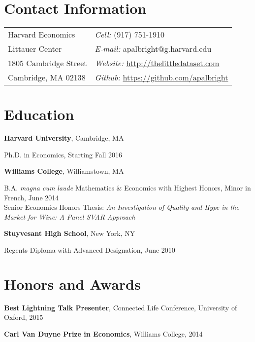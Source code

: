 \documentclass[margin,line]{res}
\begin{document}

\begin{resume}
\section{\sc Contact Information}
\vspace{.05in}
\begin{tabular}{@{}p{2in}p{4in}}
Harvard Economics  & {\it Cell:}  (917) 751-1910 \\  
Littauer Center & {\it E-mail:}  {\ttfamily apalbright@g.harvard.edu} \\              
1805 Cambridge Street  & {\it Website:} \href{http://thelittledataset.com}{\ttfamily http://thelittledataset.com}\\       
Cambridge, MA 02138  & {\it Github:} \href{https://github.com/apalbright}{\ttfamily https://github.com/apalbright}\\     
\end{tabular}

\section{\sc Education}
{\bf Harvard University}, Cambridge, MA

\vspace*{-4mm}
Ph.D. in Economics, Starting Fall 2016 

{\bf Williams College}, Williamstown, MA

\vspace*{-4mm}
B.A.  {\it magna cum laude} Mathematics \& Economics with Highest Honors, Minor in French, June 2014 \\
Senior Economics Honors Thesis: {\it An Investigation of Quality and Hype in the Market for Wine: A Panel SVAR Approach} 

\vspace{-.2cm}
{\bf Stuyvesant High School}, New York, NY

\vspace*{-4mm}
Regents Diploma with Advanced Designation, June 2010

\section{\sc Honors and Awards} 
{\bf Best Lightning Talk Presenter}, Connected Life Conference, University of Oxford, 2015

\vspace*{-3.5mm}
{\bf Carl Van Duyne Prize in Economics}, Williams College, 2014


\end{resume}
\end{document}
